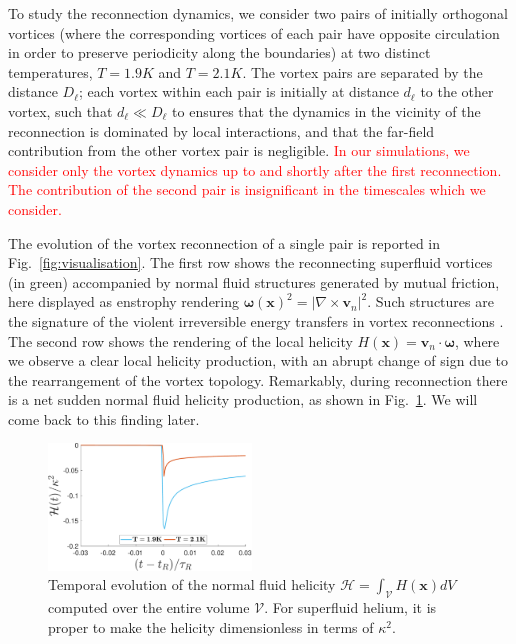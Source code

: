 \documentclass[%
 reprint,
 amsmath,amssymb,
 aps,
 prl,
]{revtex4-2}
\newcommand{\bom}{\boldsymbol{\omega}}
\def \v{\mathbf{v}}
\def \x{\mathbf{x}}
\def\red#1{\textcolor{red}{#1}}
\begin{document}
{To study the reconnection dynamics, we consider two pairs of initially orthogonal vortices (where the corresponding vortices of each pair have opposite circulation in order to preserve periodicity along the boundaries)
at two distinct temperatures, $T=1.9K$ and $T=2.1K$. The vortex pairs are separated by the distance $D_{\ell}$; each vortex within each pair is initially at distance $d_{\ell}$ to the other vortex, such that $d_{\ell}\ll D_{\ell}$ to ensures that the dynamics in the vicinity of the reconnection is dominated by local interactions, and that the far-field contribution from the other vortex pair is negligible. \red{In our simulations, we consider only the vortex dynamics up to and shortly after the first reconnection. The contribution of the second pair is insignificant in the timescales which we consider.}

The evolution of the vortex reconnection of a single pair is reported in Fig.~\ref{fig:visualisation}. 
The first row shows the reconnecting superfluid vortices (in green) accompanied by normal fluid structures generated by mutual friction, here displayed as enstrophy rendering $\bom(\x)^2=|\nabla\times \v_n|^2$. Such structures are the signature of the violent irreversible energy transfers in vortex reconnections 
\cite{stasiak2024quantum}. The second row shows the rendering of the local helicity $H(\x)=\v_n\cdot\bom$, where we observe a clear local helicity production, with an abrupt change of sign due to the rearrangement of the vortex topology. Remarkably, during reconnection there is a net 
sudden normal fluid helicity production, as shown in Fig.~\ref{fig:total-helicity}. We will come back to this finding later.
\begin{figure}[t]
    \centering
    \includegraphics*[width=0.48\textwidth]{helicity_total.pdf}
\caption{Temporal evolution of the normal fluid helicity $\mathcal{H} = \int_{\mathcal{V}}H(\x)dV$ computed over the entire volume $\mathcal{V}$. For superfluid helium, it is proper to make the helicity dimensionless in terms of $\kappa^2$.}
\label{fig:total-helicity}
\end{figure}

}
\end{document}
